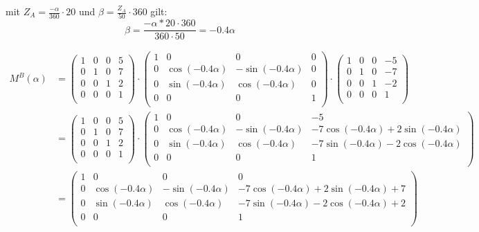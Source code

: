 \documentclass[a4paper,10pt,DIV=14]{scrartcl}
\begin{document}
mit $Z_A = \frac{-\alpha}{360} \cdot 20$ und $\beta = \frac{Z_A}{50} \cdot 360$ gilt:
$$ \beta = \frac{- \alpha * 20 \cdot 360}{360 \cdot 50} = -0.4 \alpha$$

\begin{align*}
	M^B(\alpha) & = \begin{pmatrix}
						1 & 0 & 0 & 5 \\
						0 & 1 & 0 & 7 \\
						0 & 0 & 1 & 2 \\
						0 & 0 & 0 & 1 \\
					\end{pmatrix} \cdot
					\begin{pmatrix}
						1 & 0                & 0                 & 0 \\
						0 & \cos(-0.4\alpha) & -\sin(-0.4\alpha) & 0 \\
						0 & \sin(-0.4\alpha) & \cos(-0.4\alpha)  & 0 \\
						0 & 0                & 0                 & 1 \\
					\end{pmatrix} \cdot
					\begin{pmatrix}
						1 & 0 & 0 & -5 \\
						0 & 1 & 0 & -7 \\
						0 & 0 & 1 & -2 \\
						0 & 0 & 0 & 1  \\
					\end{pmatrix} \\
				& = \begin{pmatrix}
						1 & 0 & 0 & 5 \\
						0 & 1 & 0 & 7 \\
						0 & 0 & 1 & 2 \\
						0 & 0 & 0 & 1 \\
					\end{pmatrix} \cdot
					\begin{pmatrix}
						1 & 0                & 0                 & -5                                     \\
						0 & \cos(-0.4\alpha) & -\sin(-0.4\alpha) & -7\cos(-0.4\alpha) + 2\sin(-0.4\alpha) \\
						0 & \sin(-0.4\alpha) & \cos(-0.4\alpha)  & -7\sin(-0.4\alpha) - 2\cos(-0.4\alpha) \\
						0 & 0                & 0                 & 1                                      \\
					\end{pmatrix} \\
				& = \begin{pmatrix}
						1 & 0                & 0                 & 0                                          \\
						0 & \cos(-0.4\alpha) & -\sin(-0.4\alpha) & -7\cos(-0.4\alpha) + 2\sin(-0.4\alpha) + 7 \\
						0 & \sin(-0.4\alpha) & \cos(-0.4\alpha)  & -7\sin(-0.4\alpha) - 2\cos(-0.4\alpha) + 2 \\
						0 & 0                & 0                 & 1                                          \\
					\end{pmatrix}
\end{align*}
\end{document}
